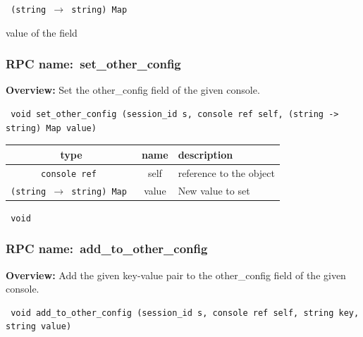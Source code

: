 \vspace{0.3cm}

{\tt 
(string $\rightarrow$ string) Map
}


value of the field
\vspace{0.3cm}
\vspace{0.3cm}
\vspace{0.3cm}
\subsubsection{RPC name:~set\_other\_config}

{\bf Overview:} 
Set the other\_config field of the given console.

\begin{verbatim} void set_other_config (session_id s, console ref self, (string -> string) Map value)\end{verbatim}



 
\vspace{0.3cm}
\begin{tabular}{|c|c|p{7cm}|}
 \hline
{\bf type} & {\bf name} & {\bf description} \\ \hline
{\tt console ref } & self & reference to the object \\ \hline 

{\tt (string $\rightarrow$ string) Map } & value & New value to set \\ \hline 

\end{tabular}

\vspace{0.3cm}

{\tt 
void
}



\vspace{0.3cm}
\vspace{0.3cm}
\vspace{0.3cm}
\subsubsection{RPC name:~add\_to\_other\_config}

{\bf Overview:} 
Add the given key-value pair to the other\_config field of the given
console.

\begin{verbatim} void add_to_other_config (session_id s, console ref self, string key, string value)\end{verbatim}


